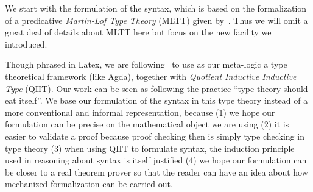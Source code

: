 We start with the formulation of the syntax, which is based on the
formalization of a predicative \textit{Martin-Lof Type Theory} (MLTT)
given by~\citet{coquand2018canonicity}. Thus we will omit a great deal
of details about MLTT here but focus on the new facility we introduced. 

Though phrased in Latex, we are following~\citet{altkap2016} to use as
our meta-logic a type theoretical framework (like Agda), 
together with \textit{Quotient Inductive Inductive Type} (QIIT). Our work can be seen as following the practice ``type theory should eat itself''\cite{dybjer1995internal, chapman2009type}. We base our formulation of the syntax in this type theory instead of a more conventional and informal representation, because (1) we hope our formulation can be precise on the mathematical object we are using (2) it is easier to validate a proof because proof checking then is simply type checking in type theory (3) when using QIIT to formulate syntax, the induction principle used in reasoning about syntax is itself justified (4) we hope our formulation can be closer to a real theorem prover so that the reader can have an idea about how mechanized formalization can be carried out.









